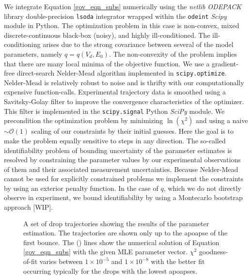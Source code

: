\documentclass[aip,reprint, floatfix]{revtex4-1}
\begin{document}
We integrate Equation \ref{gov_eqn_subs} numerically using the \emph{netlib ODEPACK} library double-precision \verb|lsoda| integrator wrapped within the \verb|odeint| \emph{Scipy} \cite{oliphant_python_2007} module in Python. The optimization problem in this case is non-convex, mixed discrete-continuous black-box (noisy), and highly ill-conditioned. The ill-conditioning arises due to the strong covariance between several of the model parameters, namely $q=q(V_d, E_0)$. The non-convexity of the problem implies that there are many local minima of the objective function. We use a gradient-free direct-search Nelder-Mead \cite{nelder_simplex_1965} algorithm implemented in \verb|scipy.optimize|. Nelder-Mead is relatively robust to noise and is thrifty with our computationally expensive function-calls. Experimental trajectory data is smoothed using a Savitsky-Golay filter \cite{savitzky_smoothing_1964} to improve the convergence characteristics of the optimizer. This filter is implemented in the \verb|scipy.signal| Python \emph{SciPy} module. We precondition the optimization problem by minimizing $\ln(\chi^2)$ and using a naive $\sim \mathcal{O}(1)$ scaling of our constraints by their initial guesses. Here the goal is to make the problem equally sensitive to steps in any direction. The so-called identifiability problem of bounding uncertainty of the parameter estimates is resolved by constraining the parameter values by our experimental observations of them and their associated measurement uncertainties. Because Nelder-Mead cannot be used for explicitly constrained problems we implement the constraints by using an exterior penalty function. In the case of $q$, which we do not directly observe in experiment, we bound identifiability by using a Montecarlo bootstrap approach [WIP].

\begin{figure}[h]
    \centering
    \resizebox{0.5\textwidth}{!}{}
    \caption{A set of drop trajectories showing the results of the parameter estimation. The trajectories are shown only up to the apoapse of the first bounce. The (\protect\redline) \hspace{0.25 mm} lines show the numerical solution of Equation \ref{gov_eqn_subs} with the given MLE parameter vector. $\chi^2$ goodness-of-fit varies between $1 \times 10^{-5}$ and $1 \times 10^{-8}$ with the better fit occurring typically for the drops with the lowest apoapses.}
    \label{fig:inverse_problem}
\end{figure}
\end{document}
